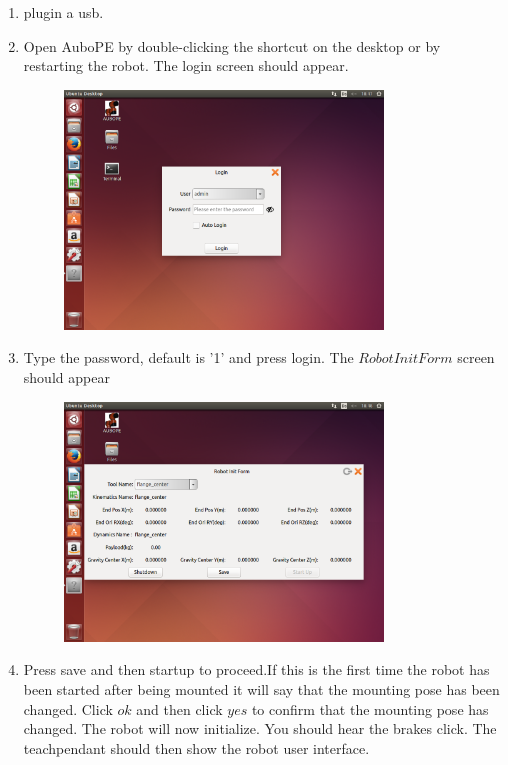 \documentclass{article}
\begin{document}
\begin{enumerate}
\item plugin a usb. 
\item Open AuboPE by double-clicking the shortcut on the desktop or by restarting the robot. The login screen should appear.
\begin{figure}[H]\centering
\includegraphics[width=0.8\textwidth]{../../Images/loginScreen.png}
\end{figure}
\item  Type the password, default is '1' and press login. The $Robot Init Form$ screen should appear
\begin{figure}[H]\centering
\includegraphics[width=0.8\textwidth]{../../Images/RobotInitForm.png}
\end{figure}
\item Press save and then startup to proceed.If this is the first time the robot has been started after being mounted it will say that the mounting pose has been changed. Click $ok$ and then click $yes$ to confirm that the mounting pose has changed. The robot will now initialize. You should hear the brakes click.  The teachpendant should then show the robot user interface. 

\end{enumerate}
\end{document}
